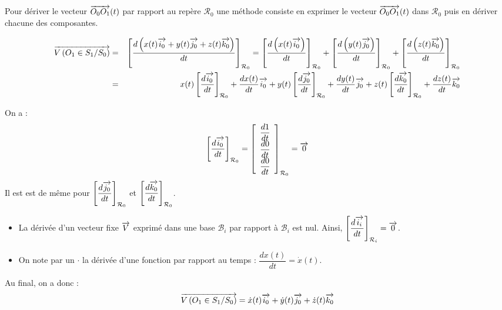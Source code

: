 \documentclass[10pt,oneside]{article}
\begin{document}
\begin{rem}
Pour dériver le vecteur $\overrightarrow{O_0 O_1}(t)$ par rapport au repère $\mathcal{R}_0$ une méthode consiste en exprimer le vecteur $\overrightarrow{O_0 O_1}(t)$ dans $\mathcal{R}_0$ puis en dériver chacune des composantes. 
\end{rem}

\begin{eqnarray*}
\overrightarrow{V\left( {O_1} \in {S_1}/{S_0}\right)} &=&  
\left[\dfrac{d\left(x(t)\overrightarrow{i_0}+y(t)\overrightarrow{j_0}+z(t)\overrightarrow{k_0} \right)}{dt}\right]_{\mathcal{R}_0}
= 
\left[\dfrac{d\left(x(t)\overrightarrow{i_0}\right)}{dt}\right]_{\mathcal{R}_0}
+\left[\dfrac{d\left(y(t)\overrightarrow{j_0}\right)}{dt}\right]_{\mathcal{R}_0}
+\left[\dfrac{d\left(z(t)\overrightarrow{k_0}\right)}{dt}\right]_{\mathcal{R}_0} \\
&=&
x(t)\left[\dfrac{d\overrightarrow{i_0}}{dt}\right]_{\mathcal{R}_0}
+ \dfrac{dx(t)}{dt} \overrightarrow{i_0}
+y(t)\left[\dfrac{d\overrightarrow{j_0}}{dt}\right]_{\mathcal{R}_0}
+ \dfrac{dy(t)}{dt} \overrightarrow{j_0}
+z(t)\left[\dfrac{d\overrightarrow{k_0}}{dt}\right]_{\mathcal{R}_0}
+ \dfrac{dz(t)}{dt} \overrightarrow{k_0} \\
\end{eqnarray*}

On a : 
$$
\left[\dfrac{d\overrightarrow{i_0}}{dt}\right]_{\mathcal{R}_0} = 
\left[
\begin{array}{c}
\dfrac{d 1}{dt}\\
\dfrac{d 0}{dt}\\
\dfrac{d  0}{dt}\\
\end{array}
\right]_{\mathcal{R}_0}
 = \overrightarrow{0}
$$
Il est est de même pour $\left[\dfrac{d\overrightarrow{j_0}}{dt}\right]_{\mathcal{R}_0}$ et $\left[\dfrac{d\overrightarrow{k_0}}{dt}\right]_{\mathcal{R}_0}$.

\begin{rem}
\begin{itemize}
\item La dérivée d'un vecteur fixe $\overrightarrow{V}$ exprimé dans une base $\mathcal{B}_i$ par rapport à $\mathcal{B}_i$ est nul. Ainsi,  $\left[\dfrac{d\overrightarrow{i_i}}{dt}\right]_{\mathcal{R}_i}=\overrightarrow{0}$.
\item On note par un $\cdot$ la dérivée d'une fonction par rapport au temps : $\dfrac{dx(t)}{dt} = \dot{x}(t)$.
\end{itemize}

\end{rem}

Au final, on a donc :
$$\overrightarrow{V\left( {O_1} \in {S_1}/{S_0}\right)} = \dot{x}(t) \overrightarrow{i_0}+\dot{y}(t) \overrightarrow{j_0}+\dot{z}(t) \overrightarrow{k_0} $$
\end{document}
